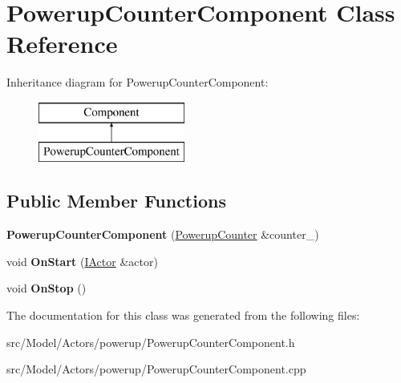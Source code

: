 \hypertarget{classPowerupCounterComponent}{}\section{Powerup\+Counter\+Component Class Reference}
\label{classPowerupCounterComponent}
Inheritance diagram for Powerup\+Counter\+Component\+:\begin{figure}[H]
\begin{center}
\leavevmode
\includegraphics[height=2.000000cm]{classPowerupCounterComponent}
\end{center}
\end{figure}
\subsection*{Public Member Functions}
\begin{DoxyCompactItemize}
\item 
{\bfseries Powerup\+Counter\+Component} (\hyperlink{classPowerupCounter}{Powerup\+Counter} \&counter\+\_\+)\hypertarget{classPowerupCounterComponent_a00d2b9ffadb75a65d50cf08bc616da7a}{}\label{classPowerupCounterComponent_a00d2b9ffadb75a65d50cf08bc616da7a}

\item 
void {\bfseries On\+Start} (\hyperlink{classIActor}{I\+Actor} \&actor)\hypertarget{classPowerupCounterComponent_a78de6fe1c8d7683b5310eccfa830e92a}{}\label{classPowerupCounterComponent_a78de6fe1c8d7683b5310eccfa830e92a}

\item 
void {\bfseries On\+Stop} ()\hypertarget{classPowerupCounterComponent_a9e5b9951f2a3742da0fd484845b8a6d3}{}\label{classPowerupCounterComponent_a9e5b9951f2a3742da0fd484845b8a6d3}

\end{DoxyCompactItemize}


The documentation for this class was generated from the following files\+:\begin{DoxyCompactItemize}
\item 
src/\+Model/\+Actors/powerup/Powerup\+Counter\+Component.\+h\item 
src/\+Model/\+Actors/powerup/Powerup\+Counter\+Component.\+cpp\end{DoxyCompactItemize}

